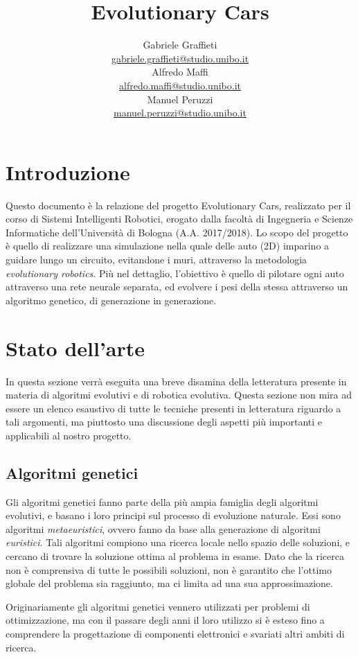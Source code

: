 \documentclass[a4paper,12pt]{article}
\title{\vspace{-5em}\Huge \textbf{Evolutionary Cars}
}
\author{
	Gabriele Graffieti \\ \small \url{gabriele.graffieti@studio.unibo.it}
	\vspace{15pt}
	\\
	Alfredo Maffi \\ \small \url{alfredo.maffi@studio.unibo.it}
	\vspace{15pt}
	\\
	Manuel Peruzzi \\ \small \url{manuel.peruzzi@studio.unibo.it}
}
\date{}
\begin{document}
\maketitle
{}
\tableofcontents
\newpage

\section{Introduzione}

Questo documento è la relazione del progetto Evolutionary Cars, realizzato per il corso di Sistemi Intelligenti Robotici, erogato dalla facoltà di Ingegneria e Scienze Informatiche dell'Università di Bologna (A.A. 2017/2018). Lo scopo del progetto è quello di realizzare una simulazione nella quale delle auto (2D) imparino a guidare lungo un circuito, evitandone i muri, attraverso la metodologia \emph{evolutionary robotics}. Più nel dettaglio, l'obiettivo è quello di pilotare ogni auto attraverso una rete neurale separata, ed evolvere i pesi della stessa attraverso un algoritmo genetico, di generazione in generazione.

\section{Stato dell'arte} \label{stato-dell-arte}
In questa sezione verrà eseguita una breve disamina della letteratura presente in materia di algoritmi evolutivi e di robotica evolutiva. Questa sezione non mira ad essere un elenco esaustivo di tutte le tecniche presenti in letteratura riguardo a tali argomenti, ma piuttosto una discussione degli aspetti più importanti e applicabili al nostro progetto. 
\subsection*{Algoritmi genetici} \label{algoritmi-genetici}
Gli algoritmi genetici fanno parte della più ampia famiglia degli algoritmi evolutivi, e basano i loro principi sul processo di evoluzione naturale. Essi sono algoritmi \emph{metaeuristici}, ovvero fanno da base alla generazione di algoritmi \emph{euristici}. Tali algoritmi compiono una ricerca locale nello spazio delle soluzioni, e cercano di trovare la soluzione ottima al problema in esame. Dato che la ricerca non è comprensiva di tutte le possibili soluzioni, non è garantito che l'ottimo globale del problema sia raggiunto, ma ci limita ad una sua approssimazione. 

Originariamente gli algoritmi genetici vennero utilizzati per problemi di ottimizzazione, ma con il passare degli anni il loro utilizzo si è esteso fino a comprendere la progettazione di componenti elettronici \cite{antenna} e svariati altri ambiti di ricerca.
\end{document}
